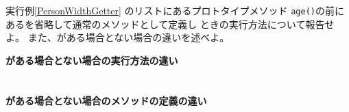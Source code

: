 \begin{Prob}\upshape\Must
 実行例\else\ref{PersonWidthGetter}\fi
 のリストにあるプロトタイプメソッド
 \texttt{age()}の前にあるを省略して通常のメソッドとして定義し
 ときの実行方法について報告せよ。
 \ifText また、がある場合とない場合の違いを述べよ。\fi
\end{Prob}
\ifText %
{\bfseries {}がある場合とない場合の実行方法の違い}\\[1\baselineskip]
  \underline{\makebox[0.95\textwidth]{}}\\[1\baselineskip]
  \underline{\makebox[0.95\textwidth]{}}\\[0.3\baselineskip]
	{\bfseries {}がある場合とない場合のメソッドの定義の違い}\\[1\baselineskip]
  \underline{\makebox[0.95\textwidth]{}}\\[1\baselineskip]
  \underline{\makebox[0.95\textwidth]{}}\\[1\baselineskip]
  \underline{\makebox[0.95\textwidth]{}}\\[1\baselineskip]
  \underline{\makebox[0.95\textwidth]{}}
	\fi
